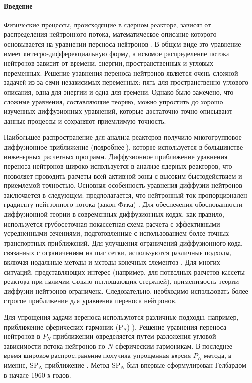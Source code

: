 \documentclass{crm-article}
\begin{document}
\paragraph{Введение}

Физические процессы, происходящие в ядерном реакторе, зависят от распределения нейтронного потока, математическое описание которого основывается на уравнении переноса нейтронов \cite{bell1970, lewis1984}.
В общем виде это уравнение имеет интегро-дифференциальную форму, а искомое распределение потока нейтронов зависит от времени, энергии, пространственных и угловых переменных. 
Решение уравнения переноса нейтронов является очень сложной задачей из-за семи независимых переменных: пять для пространственно-углового описания, одна для энергии и одна для времени.
Однако было замечено, что сложные уравнения, составляющие теорию, можно упростить до хорошо изученных диффузионных уравнений, которые достаточно точно описывают данные процессы и сохраняют приемлимую точность.

Наибольшее распространение для анализа реакторов получило многогрупповое диффузионное приближение (подробнее \cite{marchuk1981, sutton1996}), которое используется в большинстве инженерных расчетных программ. 
Диффузионное приближение уравнения переноса нейтронов широко используется в анализе ядерных реакторов, что позволяет проводить расчеты всей активной зоны с высоким быстодействием и приемлемой точностью.
Основная особенность уравнения диффузии нейтронов заключается в следующем: предполагается, что нейтронный ток пропорционален градиенту нейтронного потока (закон Фика) \cite{stacey2007}.
Для обеспечения обоснованности диффузионной теории в современных диффузионных кодах, как правило, используется грубосеточная покассетная схема расчета с эффективными усредненными сечениями, подготовленные с использованием более точных транспортных приближений.
Для улучшения ограничений диффузионного кода, связанных с ограничениям на шаг сетки, используются различные подходы, включая нодальные методы и методы конечных элементов \cite{lawrence1986}.
Для многих ситуаций, представляющих интерес (например, для потвэлных расчетов кассеты реактора при наличии сильно поглощающих стержней), применимость теории диффузии нейтронов ограничена.
Следовательно, необходимо использовать более строгое приближение для уравнения переноса нейтронов.

Для упрощения задачи переноса используются различные подходы, например, приближение сферических гармоник (P$_N$) \cite{azmy2010}).
Решение уравнения переноса нейтронов в $P_N$ приближении определяется путем разложения угловой зависимости потока нейтронов по $N$ сферическим гармоникам.
В последнее время широкое распространение получила упрощенная версия $P_N$ метода, а именно, SP$_N$ приближение \cite{mcclarren2010}.
Метод SP$_N$ был впервые сформулирован Гелбардом \cite{gelbard1961} в начале 1960-х годов.
\end{document}
